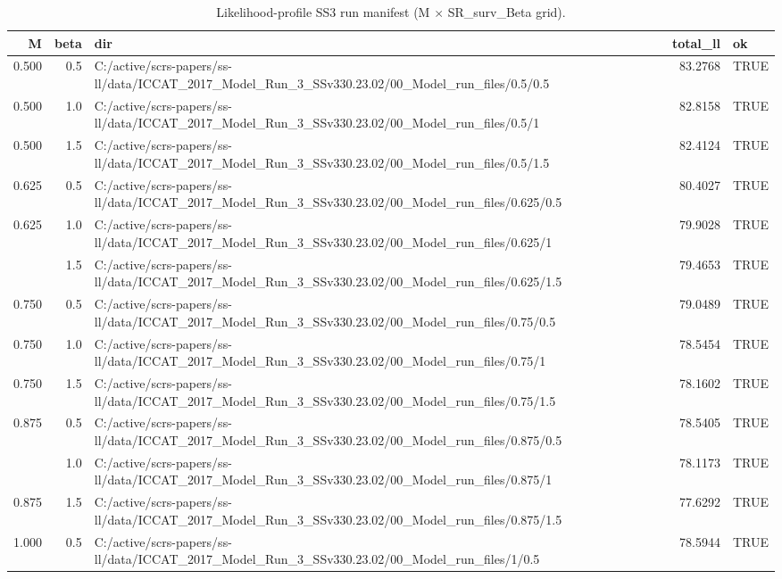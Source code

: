 \begin{table}
\caption{\label{tab:internal-profile-manifest}Likelihood-profile SS3 run manifest (M $\times$ SR\_surv\_Beta grid).}
\centering
\begin{tabular}[t]{rrlrl}
\toprule
M & beta & dir & total\_ll & ok\\
\midrule
0.500 & 0.5 & C:/active/scrs-papers/ss-ll/data/ICCAT\_2017\_Model\_Run\_3\_SSv330.23.02/00\_Model\_run\_files/0.5/0.5 & 83.2768 & TRUE\\
0.500 & 1.0 & C:/active/scrs-papers/ss-ll/data/ICCAT\_2017\_Model\_Run\_3\_SSv330.23.02/00\_Model\_run\_files/0.5/1 & 82.8158 & TRUE\\
0.500 & 1.5 & C:/active/scrs-papers/ss-ll/data/ICCAT\_2017\_Model\_Run\_3\_SSv330.23.02/00\_Model\_run\_files/0.5/1.5 & 82.4124 & TRUE\\
0.625 & 0.5 & C:/active/scrs-papers/ss-ll/data/ICCAT\_2017\_Model\_Run\_3\_SSv330.23.02/00\_Model\_run\_files/0.625/0.5 & 80.4027 & TRUE\\
0.625 & 1.0 & C:/active/scrs-papers/ss-ll/data/ICCAT\_2017\_Model\_Run\_3\_SSv330.23.02/00\_Model\_run\_files/0.625/1 & 79.9028 & TRUE\\
\addlinespace
0.625 & 1.5 & C:/active/scrs-papers/ss-ll/data/ICCAT\_2017\_Model\_Run\_3\_SSv330.23.02/00\_Model\_run\_files/0.625/1.5 & 79.4653 & TRUE\\
0.750 & 0.5 & C:/active/scrs-papers/ss-ll/data/ICCAT\_2017\_Model\_Run\_3\_SSv330.23.02/00\_Model\_run\_files/0.75/0.5 & 79.0489 & TRUE\\
0.750 & 1.0 & C:/active/scrs-papers/ss-ll/data/ICCAT\_2017\_Model\_Run\_3\_SSv330.23.02/00\_Model\_run\_files/0.75/1 & 78.5454 & TRUE\\
0.750 & 1.5 & C:/active/scrs-papers/ss-ll/data/ICCAT\_2017\_Model\_Run\_3\_SSv330.23.02/00\_Model\_run\_files/0.75/1.5 & 78.1602 & TRUE\\
0.875 & 0.5 & C:/active/scrs-papers/ss-ll/data/ICCAT\_2017\_Model\_Run\_3\_SSv330.23.02/00\_Model\_run\_files/0.875/0.5 & 78.5405 & TRUE\\
\addlinespace
0.875 & 1.0 & C:/active/scrs-papers/ss-ll/data/ICCAT\_2017\_Model\_Run\_3\_SSv330.23.02/00\_Model\_run\_files/0.875/1 & 78.1173 & TRUE\\
0.875 & 1.5 & C:/active/scrs-papers/ss-ll/data/ICCAT\_2017\_Model\_Run\_3\_SSv330.23.02/00\_Model\_run\_files/0.875/1.5 & 77.6292 & TRUE\\
1.000 & 0.5 & C:/active/scrs-papers/ss-ll/data/ICCAT\_2017\_Model\_Run\_3\_SSv330.23.02/00\_Model\_run\_files/1/0.5 & 78.5944 & TRUE\\

\end{tabular}
\end{table}
